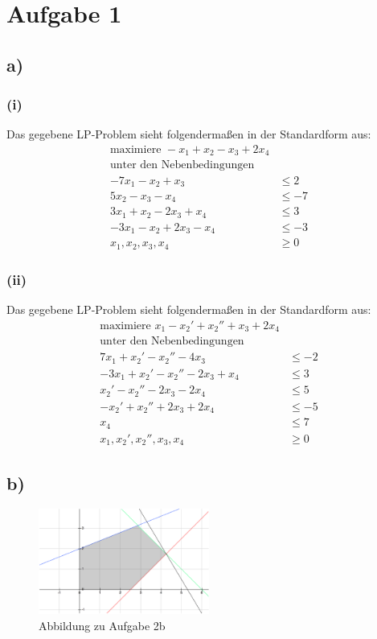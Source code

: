 \documentclass{article}
\begin{document}
\section*{Aufgabe 1}
\subsection*{a)}
\subsubsection*{(i)}

Das gegebene LP-Problem sieht folgendermaßen in der Standardform aus:
\begin{align*}
	\text{maximiere } - x_1 + x_2 - x_3 + 2x_4\\
	\text{unter den Nebenbedingungen}\\
	-7x_1 -x_2+x_3 &\leq 2\\
	5x_2-x_3-x_4 &\leq -7\\
	3x_1+x_2-2x_3+x_4 &\leq 3\\
	-3x_1-x_2+2x_3-x_4 &\leq -3\\
	x_1, x_2, x_3, x_4 &\geq 0
\end{align*}

\subsubsection*{(ii)}

Das gegebene LP-Problem sieht folgendermaßen in der Standardform aus:
\begin{align*}
	\text{maximiere } x_1 - x_2' + x_2'' + x_3 + 2x_4\\
	\text{unter den Nebenbedingungen}\\
	7x_1 + x_2' - x_2'' - 4x_3 &\leq -2\\
	-3x_1 + x_2' - x_2'' - 2x_3 + x_4 &\leq 3\\
	x_2' - x_2'' - 2x_3 - 2x_4 &\leq 5\\
	-x_2' + x_2'' + 2x_3 + 2x_4 &\leq -5\\
	x_4 &\leq 7\\
	x_1, x_2', x_2'', x_3, x_4 &\geq 0
\end{align*}

\subsection*{b)}

\begin{figure}[h]
	\center
	\includegraphics[width=0.5\textwidth]{Graph}
	\caption{Abbildung zu Aufgabe 2b}
	\label{fig:2b}
\end{figure}
\end{document}
